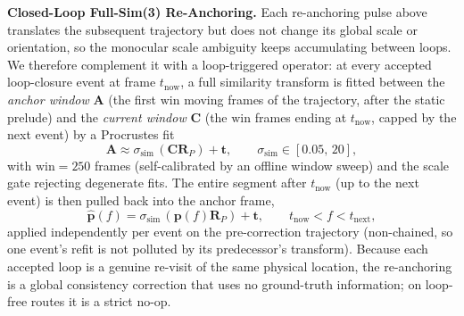 \textbf{Closed-Loop Full-Sim(3) Re-Anchoring.} Each re-anchoring pulse above translates the subsequent trajectory but does not change its global scale or orientation, so the monocular scale ambiguity keeps accumulating between loops. We therefore complement it with a loop-triggered operator: at every accepted loop-closure event at frame $t_{\mathrm{now}}$, a full similarity transform is fitted between the \emph{anchor window} $\mathbf{A}$ (the first $\mathrm{win}$ moving frames of the trajectory, after the static prelude) and the \emph{current window} $\mathbf{C}$ (the $\mathrm{win}$ frames ending at $t_{\mathrm{now}}$, capped by the next event) by a Procrustes fit
\begin{equation}
    \mathbf{A} \approx \sigma_{\mathrm{sim}}\,(\mathbf{C}\mathbf{R}_{P}) + \mathbf{t}, \qquad \sigma_{\mathrm{sim}} \in [0.05,\,20],
\end{equation}
with $\mathrm{win} = 250$ frames (self-calibrated by an offline window sweep) and the scale gate rejecting degenerate fits. The entire segment after $t_{\mathrm{now}}$ (up to the next event) is then pulled back into the anchor frame,
\begin{equation}
    \hat{\mathbf{p}}(f) = \sigma_{\mathrm{sim}}\,(\mathbf{p}(f)\mathbf{R}_{P}) + \mathbf{t}, \qquad t_{\mathrm{now}} < f < t_{\mathrm{next}},
\end{equation}
applied independently per event on the pre-correction trajectory (non-chained, so one event's refit is not polluted by its predecessor's transform). Because each accepted loop is a genuine re-visit of the same physical location, the re-anchoring is a global consistency correction that uses no ground-truth information; on loop-free routes it is a strict no-op.
